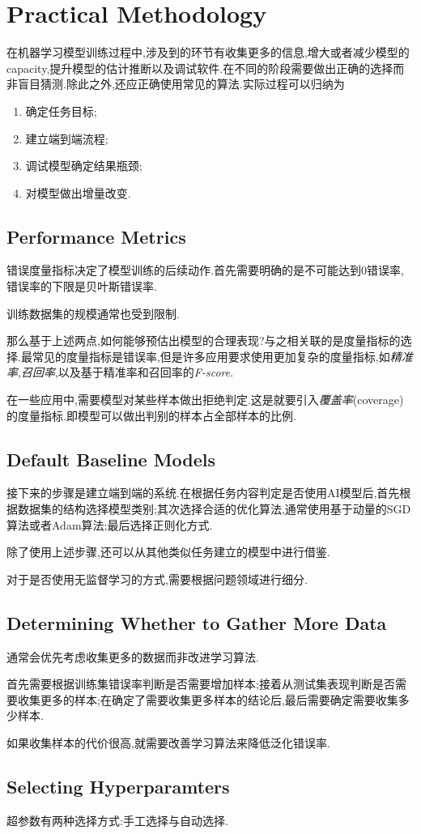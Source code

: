 \chapter{Practical Methodology}

在机器学习模型训练过程中,涉及到的环节有收集更多的信息,增大或者减少模型的capacity,提升模型的估计推断以及调试软件.在不同的阶段需要做出正确的选择而非盲目猜测.除此之外,还应正确使用常见的算法.实际过程可以归纳为
\begin{enumerate}
    \item 确定任务目标;
    \item 建立端到端流程;
    \item 调试模型确定结果瓶颈;
    \item 对模型做出增量改变.
\end{enumerate}

\section{Performance Metrics}

错误度量指标决定了模型训练的后续动作.首先需要明确的是不可能达到$0$错误率,错误率的下限是贝叶斯错误率.

训练数据集的规模通常也受到限制.

那么基于上述两点,如何能够预估出模型的合理表现?与之相关联的是度量指标的选择.最常见的度量指标是错误率,但是许多应用要求使用更加复杂的度量指标,如\textit{精准率},\textit{召回率},以及基于精准率和召回率的\textit{F-score}.

在一些应用中,需要模型对某些样本做出拒绝判定.这是就要引入\textit{覆盖率}(coverage)的度量指标.即模型可以做出判别的样本占全部样本的比例.

\section{Default Baseline Models}

接下来的步骤是建立端到端的系统.在根据任务内容判定是否使用AI模型后,首先根据数据集的结构选择模型类别;其次选择合适的优化算法,通常使用基于动量的SGD算法或者Adam算法;最后选择正则化方式.

除了使用上述步骤,还可以从其他类似任务建立的模型中进行借鉴.

对于是否使用无监督学习的方式,需要根据问题领域进行细分.

\section{Determining Whether to Gather More Data}

通常会优先考虑收集更多的数据而非改进学习算法.

首先需要根据训练集错误率判断是否需要增加样本;接着从测试集表现判断是否需要收集更多的样本;在确定了需要收集更多样本的结论后,最后需要确定需要收集多少样本.

如果收集样本的代价很高,就需要改善学习算法来降低泛化错误率.

\section{Selecting Hyperparamters}

超参数有两种选择方式:手工选择与自动选择.